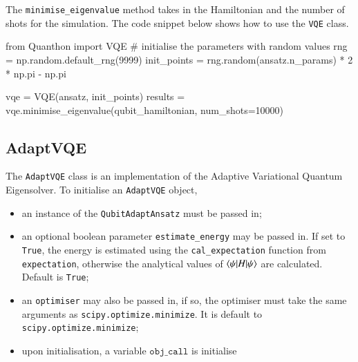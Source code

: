 The \texttt{minimise\_eigenvalue} method takes in the Hamiltonian and the number of shots for the simulation. The code snippet below shows how to use the \texttt{VQE} class.
\begin{mycode}
	from Quanthon import VQE
	# initialise the parameters with random values
	rng = np.random.default_rng(9999)
	init_points = rng.random(ansatz.n_params) * 2 * np.pi - np.pi

	vqe = VQE(ansatz, init_points)
	results = vqe.minimise_eigenvalue(qubit_hamiltonian, num_shots=10000)

\end{mycode}

\subsection{AdaptVQE}
\label{sub:implementation-adapt-vqe}
The \texttt{AdaptVQE} class is an implementation of the Adaptive Variational Quantum Eigensolver. To initialise an \texttt{AdaptVQE} object, 

\begin{itemize}
	\item an instance of the \texttt{QubitAdaptAnsatz} must be passed in;
	\item an optional boolean parameter \texttt{estimate\_energy} may be passed in. If set to \texttt{True}, the energy is estimated using the \texttt{cal\_expectation} function from \texttt{expectation}, otherwise the analytical values of $ \braket{\psi|H|\psi} $ are calculated. Default is \texttt{True};
	\item an \texttt{optimiser} may also be passed in, if so, the optimiser must take the same arguments as \texttt{scipy.optimize.minimize}. It is default to \texttt{scipy.optimize.minimize};
	\item upon initialisation, a variable $ \texttt{obj\_call}$ is initialise
\end{itemize}

